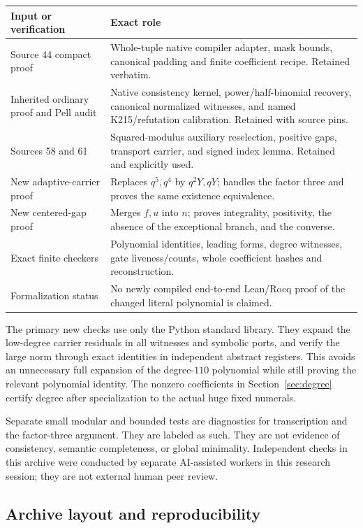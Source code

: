\documentclass[11pt]{article}
\theoremstyle{remark}
\begin{document}
\begin{longtable}{@{}p{}p{}@{}}
\toprule
Input or verification & Exact role\\
\midrule
\endhead
Source 44 compact proof & Whole-tuple native compiler adapter, mask bounds,
canonical padding and finite coefficient recipe. Retained verbatim.\\
Inherited ordinary proof and Pell audit & Native consistency kernel,
power/half-binomial recovery, canonical normalized witnesses, and named
K215/refutation calibration. Retained with source pins.\\
Sources 58 and 61 & Squared-modulus auxiliary reselection, positive gaps,
transport carrier, and signed index lemma. Retained and explicitly used.\\
New adaptive-carrier proof & Replaces $q^5,q^4$ by $q^2Y,qY$; handles the
factor three and proves the same existence equivalence.\\
New centered-gap proof & Merges $f,u$ into $n$; proves integrality,
positivity, the absence of the exceptional branch, and the converse.\\
Exact finite checkers & Polynomial identities, leading forms, degree
witnesses, gate liveness/counts, whole coefficient hashes and reconstruction.\\
Formalization status & No newly compiled end-to-end Lean/Rocq proof of
the changed literal polynomial is claimed.\\
\bottomrule
\end{longtable}

The primary new checks use only the Python standard library. They expand
the low-degree carrier residuals in all witnesses and symbolic ports, and
verify the large norm through exact identities in independent abstract
registers. This avoids an unnecessary full expansion of the degree-$110$
polynomial while still proving the relevant polynomial identity. The
nonzero coefficients in Section~\ref{sec:degree} certify degree after
specialization to the actual huge fixed numerals.

Separate small modular and bounded tests are diagnostics for transcription
and the factor-three argument. They are labeled as such. They are not
evidence of consistency, semantic completeness, or global minimality.
Independent checks in this archive were conducted by separate AI-assisted
workers in this research session; they are not external human peer review.

\subsection{Archive layout and reproducibility}
\end{document}
